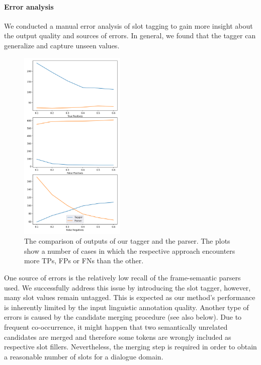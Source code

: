 \paragraph{Error analysis}
We conducted a manual error analysis of slot tagging to gain more insight about the output quality and sources of errors.
In general, we found that the tagger can generalize and capture unseen values.
\begin{figure}
    \centering
    \includegraphics[width=0.45\textwidth]{images/slots.png}
    \caption{The comparison of outputs of our tagger and the parser. The plots show a number of cases in which the respective approach encounters more TPs, FPs or FNs than the other.}
    \label{fig:tagger_comp}
\end{figure}

One source of errors is the relatively low recall of the frame-semantic parsers used.
We successfully address this issue by introducing the slot tagger, however, many slot values remain untagged.
This is expected as our method's performance is inherently limited by the input linguistic annotation quality.
Another type of errors is caused by the candidate merging procedure (see also below).
Due to frequent co-occurrence, it might happen that two semantically unrelated candidates are merged and therefore some tokens are wrongly included as respective slot fillers.
Nevertheless, the merging step is required in order to obtain a reasonable number of slots for a dialogue domain.

